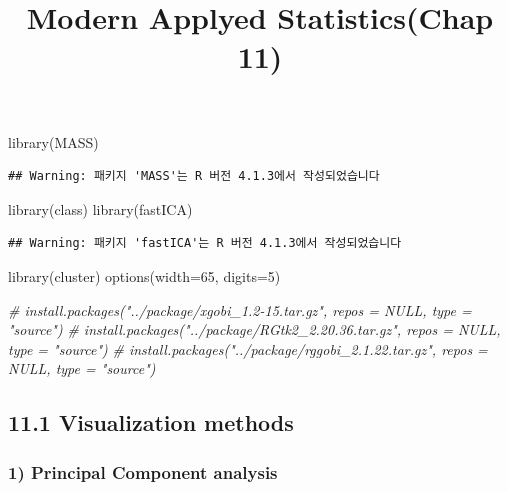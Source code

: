 \documentclass[
]{article}
\title{Modern Applyed Statistics(Chap 11)}
\author{}
\date{\vspace{-2.5em}}
\newenvironment{Shaded}{\begin{snugshade}}{\end{snugshade}}
\newcommand{\AttributeTok}[1]{\textcolor[rgb]{0.77,0.63,0.00}{#1}}
\newcommand{\CommentTok}[1]{\textcolor[rgb]{0.56,0.35,0.01}{\textit{#1}}}
\newcommand{\DecValTok}[1]{\textcolor[rgb]{0.00,0.00,0.81}{#1}}
\newcommand{\FunctionTok}[1]{\textcolor[rgb]{0.00,0.00,0.00}{#1}}
\newcommand{\NormalTok}[1]{#1}
\begin{document}
\maketitle

\begin{Shaded}
\begin{Highlighting}[]
\FunctionTok{library}\NormalTok{(MASS)}
\end{Highlighting}
\end{Shaded}

\begin{verbatim}
## Warning: 패키지 'MASS'는 R 버전 4.1.3에서 작성되었습니다
\end{verbatim}

\begin{Shaded}
\begin{Highlighting}[]
\FunctionTok{library}\NormalTok{(class)}
\FunctionTok{library}\NormalTok{(fastICA)}
\end{Highlighting}
\end{Shaded}

\begin{verbatim}
## Warning: 패키지 'fastICA'는 R 버전 4.1.3에서 작성되었습니다
\end{verbatim}

\begin{Shaded}
\begin{Highlighting}[]
\FunctionTok{library}\NormalTok{(cluster)}
\FunctionTok{options}\NormalTok{(}\AttributeTok{width=}\DecValTok{65}\NormalTok{, }\AttributeTok{digits=}\DecValTok{5}\NormalTok{)}

\CommentTok{\# install.packages("../package/xgobi\_1.2{-}15.tar.gz", repos = NULL, type = "source")}
\CommentTok{\# install.packages("../package/RGtk2\_2.20.36.tar.gz", repos = NULL, type = "source")}
\CommentTok{\# install.packages("../package/rggobi\_2.1.22.tar.gz", repos = NULL, type = "source")}
\end{Highlighting}
\end{Shaded}

\hypertarget{visualization-methods}{%
\subsection{11.1 Visualization methods}\label{visualization-methods}}

\hypertarget{principal-component-analysis}{%
\subsubsection{1) Principal Component
analysis}\label{principal-component-analysis}}
\end{document}
